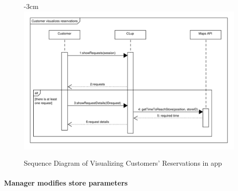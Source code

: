 \documentclass{article}
\begin{document}
												\begin{figure}
								\begin{adjustwidth} {-3cm}{}
									\centering
									\includegraphics[scale=0.8]{SD/6_visualizeReservation.pdf}\\
									\caption{Sequence Diagram of Visualizing Customers' Reservations in app}
								\end{adjustwidth}
							\end{figure}
			\newpage
			\paragraph{Manager modifies store parameters}
			
\end{document}
